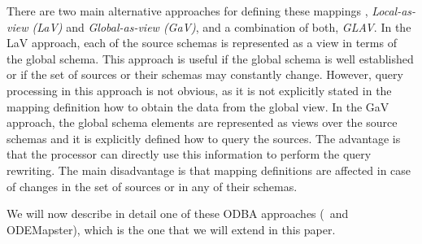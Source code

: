 There are two main alternative approaches for defining these mappings \cite{Lenzerini_02}, \textit{Local-as-view (LaV)}
and \textit{Global-as-view (GaV)}, and a combination of both, \textit{GLAV}. In the LaV approach, each of the source
schemas is represented as a view in terms of the global schema.
This approach is useful if the global schema is well established or if the set of sources or their schemas may constantly change.
However, query processing in this approach is not obvious, as it is not explicitly stated in the mapping definition how
to obtain the data from the global view.
In the GaV approach, the global schema elements are represented as views over the source schemas and it is explicitly defined how to query the sources. The advantage is that the processor can directly use this information to perform the query rewriting. The main disadvantage is that mapping definitions are affected in case of changes in the set of sources or in any of their schemas.  %

We will now describe in detail one of these ODBA approaches (\rtwoo\ and ODEMapster), which is the one that we will
extend in this paper.

